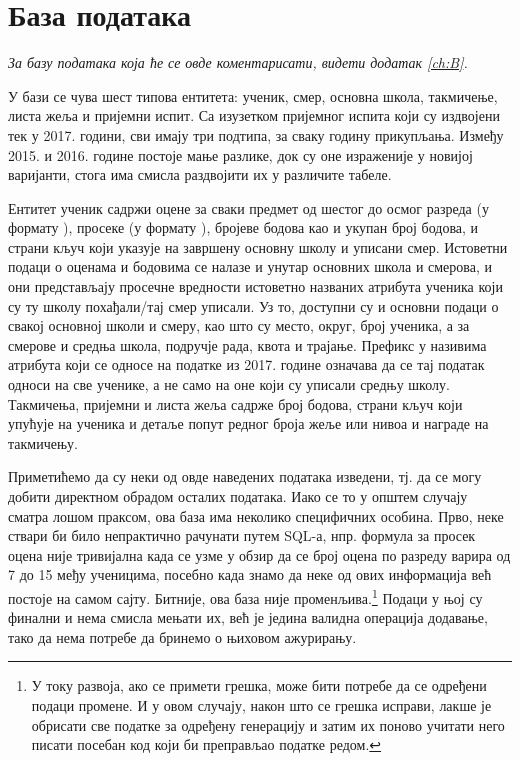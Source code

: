 \section{База података}
\vspace*{-7mm}
\emph{За базу података која ће се овде коментарисати, видети додатак \ref{ch:B}.} %

У бази се чува шест типова ентитета: ученик, смер, основна школа, такмичење, листа жеља и пријемни испит. Са изузетком пријемног испита који су издвојени тек у 2017. години, сви имају три подтипа, за сваку годину прикупљања. Између 2015. и 2016. године постоје мање разлике, док су оне израженије у новијој варијанти, стога има смисла раздвојити их у различите табеле. 

Ентитет ученик садржи оцене за сваки предмет од шестог до осмог разреда (у формату ), просеке (у формату ), бројеве бодова као и укупан број бодова, и страни кључ који указује на завршену основну школу и уписани смер. Истоветни подаци о оценама и бодовима се налазе и унутар основних школа и смерова, и они представљају просечне вредности истоветно названих атрибута ученика који су ту школу похађали/тај смер уписали. Уз то, доступни су и основни подаци о свакој основној школи и смеру, као што су место, округ, број ученика, а за смерове и средња школа, подручје рада, квота и трајање. Префикс  у називима атрибута који се односе на податке из 2017. године означава да се тај податак односи на све ученике, а не само на оне који су уписали средњу школу. Такмичења, пријемни и листа жеља садрже број бодова, страни кључ који упућује на ученика и детаље попут редног броја жеље или нивоа и награде на такмичењу.

Приметићемо да су неки од овде наведених података изведени, тј. да се могу добити директном обрадом осталих података. Иако се то у општем случају сматра лошом праксом, ова база има неколико специфичних особина. Прво, неке ствари би било непрактично рачунати путем SQL-а, нпр. формула за просек оцена није тривијална када се узме у обзир да се број оцена по разреду варира од 7 до 15 међу ученицима, посебно када знамо да неке од ових информација већ постоје на самом сајту. Битније, ова база није променљива.\footnote{У току развоја, ако се примети грешка, може бити потребе да се одређени подаци промене. И у овом случају, након што се грешка исправи, лакше је обрисати све податке за одређену генерацију и затим их поново учитати него писати посебан код који би преправљао податке редом.} Подаци у њој су финални и нема смисла мењати их, већ је једина валидна операција додавање, тако да нема потребе да бринемо о њиховом ажурирању.



